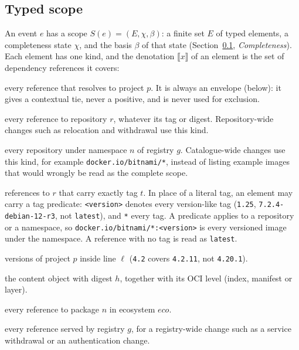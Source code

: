 \documentclass[11pt,a4paper]{article}
\newcommand{\code}[1]{\texttt{#1}}
\begin{document}
\subsection{Typed scope}
\label{sec:scope}
An event $e$ has a scope $S(e) = (E, \chi, \beta)$: a finite set $E$
of typed elements, a completeness state $\chi$, and the basis $\beta$
of that state (Section~\ref{sec:scope}, \emph{Completeness}). Each
element has one kind,
and the denotation $\llbracket x\rrbracket$ of an element is the set of
dependency references it covers:
\begin{description}[leftmargin=*,font=\normalfont\itshape,nosep]
  \item[project $p$:] every reference that resolves to project $p$.
    It is always an envelope (below): it gives a contextual tie, never
    a positive, and is never used for exclusion.
  \item[repository $r$:] every reference to repository $r$, whatever
    its tag or digest. Repository-wide changes such as relocation and
    withdrawal use this kind.
  \item[namespace $g/n/{*}$:] every repository under namespace $n$ of
    registry $g$. Catalogue-wide changes use this kind, for example
    \code{docker.io/bitnami/*}, instead of listing example images that
    would wrongly be read as the complete scope.
  \item[tag $r{:}t$:] references to $r$ that carry exactly tag $t$. In
    place of a literal tag, an element may carry a tag predicate:
    \code{<version>} denotes every version-like tag (\code{1.25},
    \code{7.2.4-debian-12-r3}, not \code{latest}), and \code{*} every
    tag. A predicate applies to a repository or a namespace, so
    \code{docker.io/bitnami/*:<version>} is every versioned image
    under the namespace. A reference with no tag is read as
    \code{latest}.
  \item[release line $(p, \ell)$:] versions of project $p$ inside line
    $\ell$ (\code{4.2} covers \code{4.2.11}, not \code{4.20.1}).
  \item[object $r@h$:] the content object with digest $h$, together
    with its OCI level (index, manifest or layer).
  \item[package $(\mathit{eco}, n)$:] every reference to package $n$ in
    ecosystem $\mathit{eco}$.
  \item[registry $g$:] every reference served by registry $g$, for a
    registry-wide change such as a service withdrawal or an
    authentication change.
\end{description}
\end{document}
